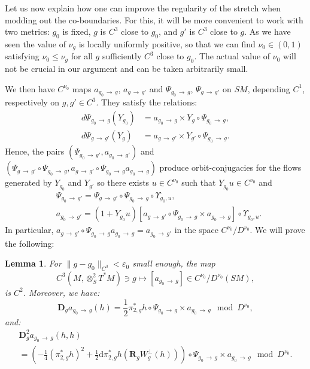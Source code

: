 \documentclass[10pt]{amsart}
\newtheorem{lemm}[theo]{Lemma}\newtheorem{prop}[theo]{Proposition}\newtheorem{coro}[theo]{Corollary}\newtheorem{conj}[theo]{Conjecture}
\theoremstyle{definition}\newtheorem{defi}[theo]{Definition}\newtheorem{rema}[theo]{Remark}\newtheorem{exam}[theo]{Example}\newtheorem{exem}[theo]{Example}\newtheorem{nota}[theo]{Notation}
\newcommand{\RR}{\mathbf{R}}
\newcommand{\bdD}{\mathbf{D}}
\newcommand{\eps}{\varepsilon}
\newcommand{\dd}{\mathrm{d}}
\begin{document}
Let us now explain how one can improve the regularity of the stretch when modding out the co-boundaries. For this, it will be more convenient to work with two metrics: $g_0$ is fixed, $g$ is $C^3$ close to $g_0$, and $g'$ is $C^3$ close to $g$. As we have seen the value of $\nu_g$ is locally uniformly positive, so that we can find $\nu_0\in (0,1)$ satisfying $\nu_0 \leq \nu_g$ for all $g$ sufficiently $C^3$ close to $g_0$. The actual value of $\nu_0$ will not be crucial in our argument and can be taken arbitrarily small.

We then have $C^{\nu_0}$ maps $a_{g_0\,\to\,g}$, $a_{g\,\to\,g'}$ and $\Psi_{g_0\,\to\,g}$, $\Psi_{g\,\to\,g'}$ on $SM$, depending $C^1$, respectively on $g,g'\in C^3$. They satisfy the relations:
\begin{equation}
\begin{split}
d \Psi_{g_0\,\to\,g}(Y_{g_0}) &= a_{g_0\,\to\,g}\times Y_g \circ \Psi_{g_0\,\to\,g},\label{eq:conjugation-bis}
\\
d \Psi_{g\,\to\,g'} (Y_g) &= a_{g\,\to\,g'} \times Y_{g'}\circ \Psi_{g_0\,\to\,g}.
\end{split}
\end{equation}
Hence, the pairs $(\Psi_{g_0\,\to\,g'},a_{g_0\, \to\,g'})$ and $(\Psi_{g\,\to\,g'} \circ \Psi_{g_0\,\to\,g}, a_{g\,\to\,g'} \circ \Psi_{g_0\,\to\,g} a_{g_0\,\to\,g})$ produce orbit-conjugacies for the flows generated by $Y_{g_0}$ and $Y_{g'}$ so there exists $u \in C^{\nu_0}$ such that $Y_{g_0} u \in C^{\nu_0}$ and
\begin{equation}\label{equation:life}
\begin{split}
& \Psi_{g_0\,\to\,g'} = \Psi_{g\,\to\,g'} \circ \Psi_{g_0\,\to\,g}\circ \Upsilon_{g_0,u}, \\
&a_{g_0\,\to\,g'} = \left(1 + Y_{g_0} u\right) \left[a_{g\,\to\,g'} \circ \Psi_{g_0\,\to\,g} \times a_{g_0\,\to\,g}\right] \circ \Upsilon_{g_0,u}.
\end{split}
\end{equation}
In particular, $a_{g\,\to\,g'} \circ \Psi_{g_0 \,\to\,g} a_{g_0\,\to\,g} = a_{g_0\,\to\,g'}$ in the space $C^{\nu_0}/D^{\nu_0}$. We will prove the following:



\begin{lemm}\label{lemma:derivative-stretch-mod-Dnu}
For $\|g - g_0\|_{C^3} < \eps_0$ small enough, the map
\[
C^3\left(M,\otimes^2_S T^*M\right) \ni g \mapsto [a_{g_0\,\to\,g}] \in C^{\nu_0}/D^{\nu_0}(SM),
\]
is $C^2$. Moreover, we have:
\begin{equation}\label{eq:log-derivative-stretch}
\bdD_g a_{g_0\,\to\,g} (h) = \frac{1}{2}\pi_{2,g}^\ast h \circ \Psi_{g_0\,\to\,g} \times a_{g_0\,\to\,g} \mod D^{\nu_0},
\end{equation}
and:
\begin{multline}\label{equation:seconde-derivative}
\bdD^2_{g} a_{g_0\,\to\,g}(h,h) \\
= \left(-\frac{1}{4} \left(\pi_{2,g}^\ast h\right)^2 + \frac{1}{2} \dd \pi_{2,g}^\ast h\left(\RR_g W^\bot_g(h) \right)\right) \circ \Psi_{g_0\,\to\,g} \times a_{g_0\,\to\,g} \mod D^{\nu_0}.
\end{multline}
\end{lemm}
\end{document}

